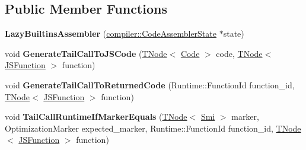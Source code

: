 \subsection*{Public Member Functions}
\begin{DoxyCompactItemize}
\item 
\mbox{\label{classv8_1_1internal_1_1LazyBuiltinsAssembler_afa0088e9f69d9326c69dbabdb04b8744}} 
{\bfseries Lazy\+Builtins\+Assembler} (\mbox{\hyperlink{classv8_1_1internal_1_1compiler_1_1CodeAssemblerState}{compiler\+::\+Code\+Assembler\+State}} $\ast$state)
\item 
\mbox{\label{classv8_1_1internal_1_1LazyBuiltinsAssembler_a48c1f737a11ea11e1c6b148b9ad3ff36}} 
void {\bfseries Generate\+Tail\+Call\+To\+J\+S\+Code} (\mbox{\hyperlink{classv8_1_1internal_1_1compiler_1_1TNode}{T\+Node}}$<$ \mbox{\hyperlink{classv8_1_1internal_1_1Code}{Code}} $>$ code, \mbox{\hyperlink{classv8_1_1internal_1_1compiler_1_1TNode}{T\+Node}}$<$ \mbox{\hyperlink{classv8_1_1internal_1_1JSFunction}{J\+S\+Function}} $>$ function)
\item 
\mbox{\label{classv8_1_1internal_1_1LazyBuiltinsAssembler_a634d441d564577d562def8cb4c589073}} 
void {\bfseries Generate\+Tail\+Call\+To\+Returned\+Code} (Runtime\+::\+Function\+Id function\+\_\+id, \mbox{\hyperlink{classv8_1_1internal_1_1compiler_1_1TNode}{T\+Node}}$<$ \mbox{\hyperlink{classv8_1_1internal_1_1JSFunction}{J\+S\+Function}} $>$ function)
\item 
\mbox{\label{classv8_1_1internal_1_1LazyBuiltinsAssembler_a2fe4c92efa92d82f6d3b84057a917aa1}} 
void {\bfseries Tail\+Call\+Runtime\+If\+Marker\+Equals} (\mbox{\hyperlink{classv8_1_1internal_1_1compiler_1_1TNode}{T\+Node}}$<$ \mbox{\hyperlink{classv8_1_1internal_1_1Smi}{Smi}} $>$ marker, Optimization\+Marker expected\+\_\+marker, Runtime\+::\+Function\+Id function\+\_\+id, \mbox{\hyperlink{classv8_1_1internal_1_1compiler_1_1TNode}{T\+Node}}$<$ \mbox{\hyperlink{classv8_1_1internal_1_1JSFunction}{J\+S\+Function}} $>$ function)
\item 
\mbox{\label{classv8_1_1internal_1_1LazyBuiltinsAssembler_ab31967cbab67770db88bc2dc9e1d4b73}} 

\end{DoxyCompactItemize}
